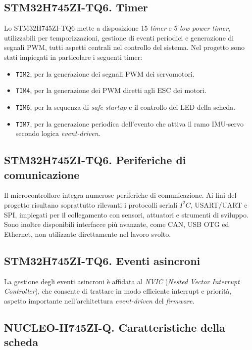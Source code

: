 \documentclass[11pt]{report}
\begin{document}
	\subsection{STM32H745ZI-TQ6. Timer}
	Lo STM32H745ZI-TQ6 mette a disposizione 15 \textit{timer} e 5 \textit{low power timer}, utilizzabili per temporizzazioni, gestione di eventi periodici e generazione di segnali PWM, tutti aspetti centrali nel controllo del sistema. Nel progetto sono stati impiegati in particolare i seguenti timer:
	\begin{itemize}
		\item \texttt{TIM2}, per la generazione dei segnali PWM dei servomotori.
		\item \texttt{TIM4}, per la generazione dei PWM diretti agli ESC dei motori.
		\item \texttt{TIM6}, per la sequenza di \textit{safe startup} e il controllo dei LED della scheda.
		\item \texttt{TIM7}, per la generazione periodica dell'evento che attiva il ramo IMU-servo secondo logica \textit{event-driven}.
		
	\end{itemize}
	
	\subsection{STM32H745ZI-TQ6. Periferiche di comunicazione}
	Il microcontrollore integra numerose periferiche di comunicazione. Ai fini del progetto risultano soprattutto rilevanti i protocolli seriali $I^{2}C$, USART/UART e SPI, impiegati per il collegamento con sensori, attuatori e strumenti di sviluppo. Sono inoltre disponibili interfacce più avanzate, come CAN, USB OTG ed Ethernet, non utilizzate direttamente nel lavoro svolto.
	
	\subsection{STM32H745ZI-TQ6. Eventi asincroni}
	La gestione degli eventi asincroni è affidata al \textit{NVIC} (\textit{Nested Vector Interrupt Controller}), che consente di trattare in modo efficiente interrupt e priorità, aspetto importante nell'architettura \textit{event-driven} del \textit{firmware}.
	
	
	\subsection{NUCLEO-H745ZI-Q. Caratteristiche della scheda}
	
\end{document}
